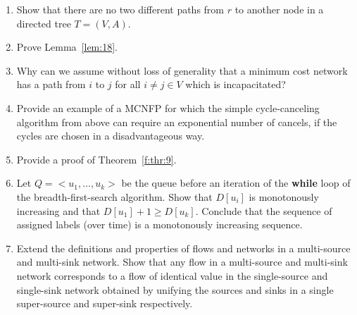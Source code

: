 \begin{enumerate}[1)]
\item Show that there are no two different paths from $r$ to another
  node in a directed  tree $T = (V,A)$.  
\item Prove Lemma~\ref{lem:18}. 
\item  
    Why can we assume without loss of generality  that a minimum cost
    network has      a path from $i$ to $j$ for      all $i\neq j\in V$
    which is incapacitated? 
\item 
    Provide an example of a MCNFP for which the simple cycle-canceling
    algorithm from above can require an exponential number of
    cancels, if the cycles are chosen in a disadvantageous way. 
\item   Provide a proof of Theorem~\ref{f:thr:9}. 
\item Let $Q = <u_1,\ldots,u_k>$ be the queue before an iteration of the
  {\bf while} loop of the breadth-first-search algorithm. Show that
  $D[u_i]$ is monotonously increasing and that $D[u_1]+1\geq D[u_k]$. 
  Conclude that the sequence of assigned  labels (over time) is a
  monotonously increasing sequence. \label{item:16}
\item Extend the definitions and properties of flows and networks 
      in a multi-source and multi-sink network. Show that any flow 
      in a multi-source and multi-sink network corresponds to a 
      flow of identical value in the single-source and 
      single-sink network obtained by unifying the sources and 
      sinks in a single super-source and super-sink respectively.
\end{enumerate}



